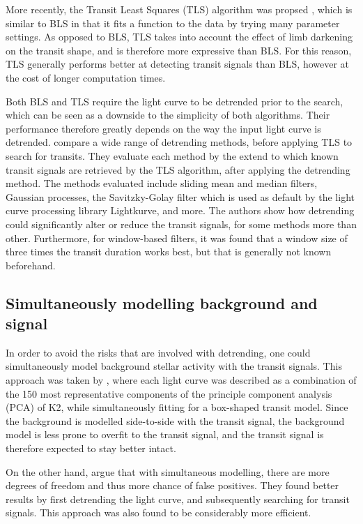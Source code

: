 More recently, the Transit Least Squares (TLS) algorithm was propsed \citep{hippke2019optimized}, which is similar to BLS in that it fits a function to the data by trying many parameter settings. As opposed to BLS, TLS takes into account the effect of limb darkening on the transit shape, and is therefore more expressive than BLS. For this reason, TLS generally performs better at detecting transit signals than BLS, however at the cost of longer computation times.  

Both BLS and TLS require the light curve to be detrended prior to the search, which can be seen as a downside to the simplicity of both algorithms. Their performance therefore greatly depends on the way the input light curve is detrended. \cite{hippke2019wotan} compare a wide range of detrending methods, before applying TLS to search for transits. They evaluate each method by the extend to which known transit signals are retrieved by the TLS algorithm, after applying the detrending method. The methods evaluated include sliding mean and median filters, Gaussian processes, the Savitzky-Golay filter which is used as default by the light curve processing library Lightkurve, and more. The authors show how detrending could significantly alter or reduce the transit signals, for some methods more than other. Furthermore, for window-based filters, it was found that a window size of three times the transit duration works best, but that is generally not known beforehand.


\subsection{Simultaneously modelling background and signal}
In order to avoid the risks that are involved with detrending, one could simultaneously model background stellar activity with the transit signals. This approach was taken by \cite{foreman2015systematic}, where each light curve was described as a combination of the 150 most representative components of the principle component analysis (PCA) of K2, while simultaneously fitting for a box-shaped transit model. Since the background is modelled side-to-side with the transit signal, the background model is less prone to overfit to the transit signal, and the transit signal is therefore expected to stay better intact.

On the other hand, \cite{kovacs2016periodic} argue that with simultaneous modelling, there are more degrees of freedom and thus more chance of false positives. They found better results by first detrending the light curve, and subsequently searching for transit signals. This approach was also found to be considerably more efficient.

